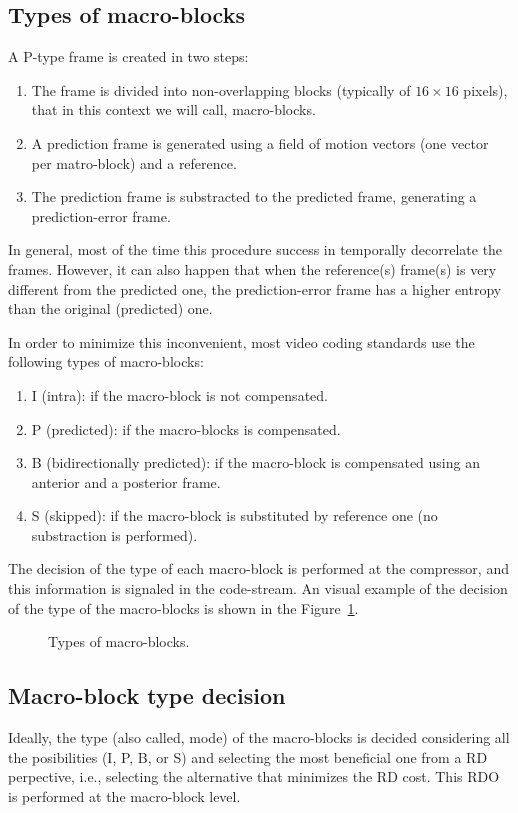 \subsection{Types of macro-blocks}
A P-type frame is created in two steps:
\begin{enumerate}
\item The frame is divided into non-overlapping blocks (typically of
  $16\times 16$ pixels), that in this context we will call,
  macro-blocks.
\item A prediction frame is generated using a field of motion vectors
  (one vector per matro-block) and a reference.
\item The prediction frame is substracted to the predicted frame,
  generating a prediction-error frame.
\end{enumerate}
In general, most of the time this procedure success in temporally
decorrelate the frames. However, it can also happen that when the
reference(s) frame(s) is very different from the predicted one, the
prediction-error frame has a higher entropy than the original
(predicted) one.

In order to minimize this inconvenient, most video coding standards
use the following types of macro-blocks:
\begin{enumerate}
\item I (intra): if the macro-block is not compensated.
\item P (predicted): if the macro-blocks is compensated.
\item B (bidirectionally predicted): if the macro-block is compensated
  using an anterior and a posterior frame.
\item S (skipped): if the macro-block is substituted by reference one
  (no substraction is performed).
\end{enumerate}
The decision of the type of each macro-block is performed at the
compressor, and this information is signaled in the code-stream. An
visual example of the decision of the type of the macro-blocks is
shown in the Figure~\ref{fig:macroblocks}.

\begin{figure}
  \centering
  \caption{Types of macro-blocks.}
  \label{fig:macroblocks}
\end{figure}

\subsection{Macro-block type decision}
Ideally, the type (also called, mode) of the macro-blocks is decided
considering all the posibilities (I, P, B, or S) and selecting the
most beneficial one from a RD perpective, i.e., selecting the
alternative that minimizes the RD cost. This RDO is performed at the
macro-block level.

